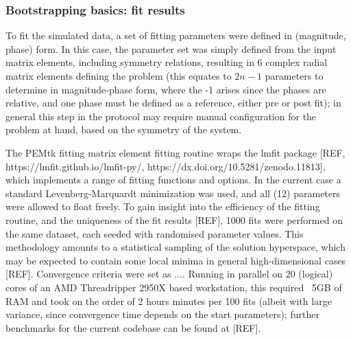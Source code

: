 \subsubsection{Bootstrapping basics: fit results}

To fit the simulated data, a set of fitting parameters were defined in (magnitude, phase) form. In this case, the parameter set was simply defined from the input matrix elements, including symmetry relations, resulting in 6 complex radial matrix elements defining the problem (this equates to $2n-1$ parameters to determine in magnitude-phase form, where the -1 arises since the phases are relative, and one phase must be defined as a reference, either pre or post fit); in general this step in the protocol may require manual configuration for the problem at hand, based on the symmetry of the system. 

The PEMtk fitting matrix element fitting routine wraps the lmfit package [REF, https://lmfit.github.io/lmfit-py/, https://dx.doi.org/10.5281/zenodo.11813], which implements a range of fitting functions and options. In the current case a standard Levenberg-Marquardt minimization was used, and all (12) parameters were allowed to float freely. To gain insight into the efficiency of the fitting routine, and the uniqueness of the fit results [REF], 1000 fits were performed on the same dataset, each seeded with randomised parameter values. This methodology amounts to a statistical sampling of the solution hyperspace, which may be expected to contain some local minima in general high-dimensional cases [REF]. Convergence criteria were set as .... Running in parallel on 20 (logical) cores of an AMD Threadripper 2950X based workstation, this required ~5GB of RAM and took on the order of 2 hours minutes per 100 fits (albeit with large variance, since convergence time depends on the start parameters); further benchmarks for the current codebase can be found at [REF].





